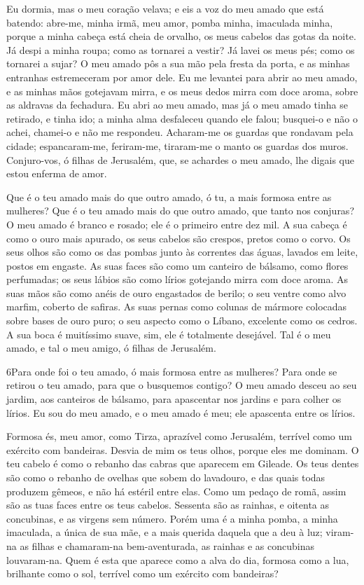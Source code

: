 Eu dormia, mas o meu coração velava; e eis a voz do meu amado que
está batendo: abre-me, minha irmã, meu amor, pomba minha, imaculada
minha, porque a minha cabeça está cheia de orvalho, os meus cabelos
das gotas da noite. Já despi a minha roupa; como as tornarei a
vestir? Já lavei os meus pés; como os tornarei a sujar? O meu
amado pôs a sua mão pela fresta da porta, e as minhas entranhas
estremeceram por amor dele. Eu me levantei para abrir ao meu
amado, e as minhas mãos gotejavam mirra, e os meus dedos mirra com
doce aroma, sobre as aldravas da fechadura. Eu abri ao meu
amado, mas já o meu amado tinha se retirado, e tinha ido; a minha
alma desfaleceu quando ele falou; busquei-o e não o achei, chamei-o
e não me respondeu. Acharam-me os guardas que rondavam pela
cidade; espancaram-me, feriram-me, tiraram-me o manto os guardas dos
muros. Conjuro-vos, ó filhas de Jerusalém, que, se achardes o
meu amado, lhe digais que estou enferma de amor.

Que é o teu amado mais do que outro amado, ó tu, a mais formosa
entre as mulheres? Que é o teu amado mais do que outro amado, que
tanto nos conjuras? O meu amado é branco e rosado; ele é o
primeiro entre dez mil. A sua cabeça é como o ouro mais
apurado, os seus cabelos são crespos, pretos como o corvo. Os
seus olhos são como os das pombas junto às correntes das águas,
lavados em leite, postos em engaste. As suas faces são como
um canteiro de bálsamo, como flores perfumadas; os seus lábios são
como lírios gotejando mirra com doce aroma. As suas mãos são
como anéis de ouro engastados de berilo; o seu ventre como alvo
marfim, coberto de safiras. As suas pernas como colunas de
mármore colocadas sobre bases de ouro puro; o seu aspecto como o
Líbano, excelente como os cedros.
 A sua boca é muitíssimo suave, sim, ele é totalmente desejável.
Tal é o meu amado, e tal o meu amigo, ó filhas de Jerusalém.

\medskip

\lettrine{6} Para onde foi o teu amado, ó mais formosa entre
as mulheres? Para onde se retirou o teu amado, para que o busquemos
contigo? O meu amado desceu ao seu jardim, aos canteiros de
bálsamo, para apascentar nos jardins e para colher os lírios. Eu
sou do meu amado, e o meu amado é meu; ele apascenta entre os
lírios.

Formosa és, meu amor, como Tirza, aprazível como Jerusalém,
terrível como um exército com bandeiras. Desvia de mim os teus
olhos, porque eles me dominam. O teu cabelo é como o rebanho das
cabras que aparecem em Gileade. Os teus dentes são como o
rebanho de ovelhas que sobem do lavadouro, e das quais todas
produzem gêmeos, e não há estéril entre elas. Como um pedaço de
romã, assim são as tuas faces entre os teus cabelos. Sessenta
são as rainhas, e oitenta as concubinas, e as virgens sem número.
Porém uma é a minha pomba, a minha imaculada, a única de sua
mãe, e a mais querida daquela que a deu à luz; viram-na as filhas e
chamaram-na bem-aventurada, as rainhas e as concubinas louvaram-na.
Quem é esta que aparece como a alva do dia, formosa como a
lua, brilhante como o sol, terrível como um exército com bandeiras?

